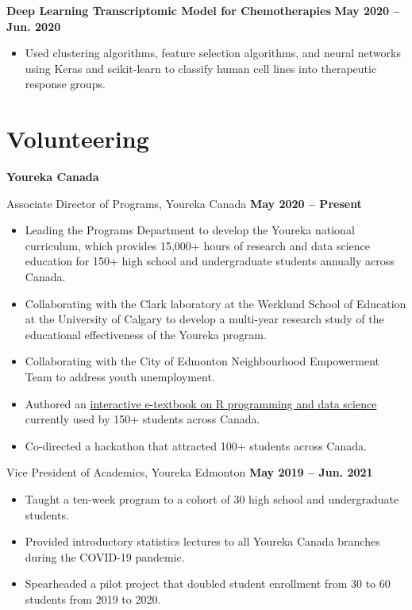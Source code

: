 \documentclass{article}
\begin{document}
\textbf{Deep Learning Transcriptomic Model for Chemotherapies} \hfill \textbf{May 2020 -- Jun. 2020}
\begin{itemize}
    \item Used clustering algorithms, feature selection algorithms, and neural networks using Keras and scikit-learn to classify human cell lines into therapeutic response groups.
\end{itemize}


\section*{\textcolor{my_colour}{Volunteering}}
\vspace{-.25em} \hrulefill \vspace{.75em}

\textbf{Youreka Canada}

Associate Director of Programs, Youreka Canada \hfill \textbf{May 2020 -- Present}
\begin{itemize}
    \item Leading the Programs Department to develop the Youreka national curriculum, which provides 15,000+ hours of research and data science education for 150+ high school and undergraduate students annually across Canada.
    \item Collaborating with the Clark laboratory at the Werklund School of Education at the University of Calgary to develop a multi-year research study of the educational effectiveness of the Youreka program.
    \item Collaborating with the City of Edmonton Neighbourhood Empowerment Team to address youth unemployment.
    \item Authored an \href{https://youreka-textbook.netlify.app/}{interactive e-textbook on R programming and data science} currently used by 150+ students across Canada.
    \item Co-directed a hackathon that attracted 100+ students across Canada.
\end{itemize}

Vice President of Academics, Youreka Edmonton \hfill \textbf{May 2019 -- Jun. 2021}
\begin{itemize}
    \item Taught a ten-week program to a cohort of 30 high school and undergraduate students.
    \item Provided introductory statistics lectures to all Youreka Canada branches during the COVID-19 pandemic.
    \item Spearheaded a pilot project that doubled student enrollment from 30 to 60 students from 2019 to 2020.
\end{itemize}
\end{document}
